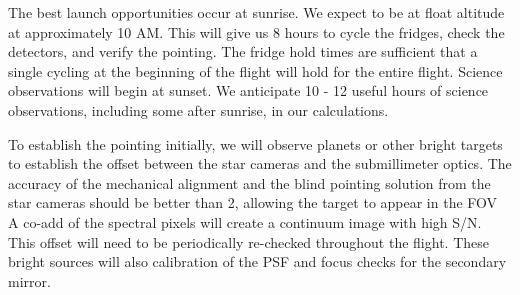 

The best launch opportunities occur at sunrise.  We expect to be at float altitude at approximately 10 AM.  This will give us 8 hours to cycle the fridges, check the detectors, and verify the pointing.  The fridge hold times are sufficient that a single cycling at the beginning of the flight will hold for the entire flight.  Science observations will begin at sunset.  We anticipate 10 - 12 useful hours of science observations, including some after sunrise, in our calculations.

To establish the pointing initially, we will observe planets or other bright targets to establish the offset between the star cameras and the submillimeter optics.  The accuracy of the mechanical alignment and the blind pointing solution from the star cameras should be better than 2\arcmin, allowing the target to appear in the FOV 
A co-add of the spectral pixels will create a continuum image with high S/N.  This offset will need to be periodically re-checked throughout the flight.  These bright sources will also calibration of the PSF and focus checks for the secondary mirror.

